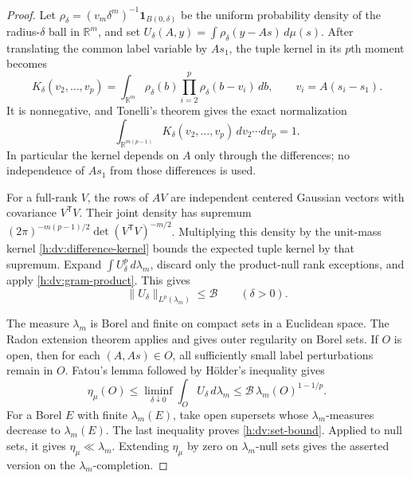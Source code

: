 \begin{proof}
Let \(\rho_\delta=(v_m\delta^m)^{-1}
\mathbf1_{B(0,\delta)}\) be the uniform probability density of the
radius-\(\delta\) ball in \(\mathbb R^m\), and set
\(U_\delta(A,y)=\int\rho_\delta(y-As)\,d\mu(s)\).
After translating the common label variable by \(As_1\), the tuple
kernel in its \(p\)th moment becomes
\[
 K_\delta(v_2,\ldots,v_p)
 =\int_{\mathbb R^m}\rho_\delta(b)
       \prod_{i=2}^p\rho_\delta(b-v_i)\,db,
 \qquad v_i=A(s_i-s_1).
\]
It is nonnegative, and Tonelli's theorem gives the exact normalization
\begin{equation}
 \int_{\mathbb R^{m(p-1)}}K_\delta(v_2,\ldots,v_p)
       \,dv_2\cdots dv_p=1.
 \label{h:dv:difference-kernel}
\end{equation}
In particular the kernel depends on \(A\) only through the differences;
no independence of \(As_1\) from those differences is used.

For a full-rank \(V\), the rows of \(AV\) are independent centered
Gaussian vectors with covariance \(V^{\mathsf T}V\).  Their joint
density has supremum
\((2\pi)^{-m(p-1)/2}\det(V^{\mathsf T}V)^{-m/2}\).
Multiplying this density by the unit-mass kernel
\eqref{h:dv:difference-kernel} bounds the expected tuple kernel by
that supremum.  Expand \(\int U_\delta^p\,d\lambda_m\), discard only
the product-null rank exceptions, and apply
\eqref{h:dv:gram-product}.  This gives
\begin{equation}
 \|U_\delta\|_{L^p(\lambda_m)}\le\mathcal B
 \qquad(\delta>0).
 \label{h:dv:difference-moment}
\end{equation}

The measure \(\lambda_m\) is Borel and finite on compact sets in a
Euclidean space.  The Radon extension theorem
\cite[Corollary~2.11]{StanfordRadonMeasures} applies and gives outer
regularity on Borel sets.  If \(O\) is open, then for
each \((A,As)\in O\), all sufficiently small label perturbations
remain in \(O\).  Fatou's lemma followed by H\"older's inequality gives
\[
 \eta_\mu(O)
 \le\liminf_{\delta\downarrow0}\int_O U_\delta\,d\lambda_m
 \le\mathcal B\,\lambda_m(O)^{1-1/p}.
\]
For a Borel \(E\) with finite \(\lambda_m(E)\), take open supersets
whose \(\lambda_m\)-measures decrease to \(\lambda_m(E)\).  The last
inequality proves \eqref{h:dv:set-bound}.  Applied to null sets, it
gives \(\eta_\mu\ll\lambda_m\).  Extending \(\eta_\mu\) by zero on
\(\lambda_m\)-null sets gives the asserted version on the
\(\lambda_m\)-completion.


\end{proof}
